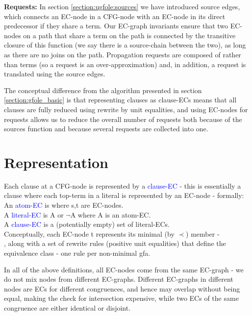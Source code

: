 \textbf{Requests:} In section \ref{section:ugfole:sources} we have introduced source edges, which connects an EC-node in a CFG-node with an EC-node in its direct predecessor if they share a term. Our EC-graph invariants ensure that two EC-nodes on a path that share a term on the path is connected by the transitive closure of this function (we say there is a source-chain between the two), as long as there are no joins on the path. Propagation requests are composed of \GFAs{} rather than terms (so a request is an over-approximation) and, in addition, a request is translated using the source edges.

\bigskip

The conceptual difference from the algorithm presented in section \ref{section:gfole_basic} is that representing clauses as clause-ECs means that all clauses are fully reduced using rewrite by unit equalities, and using EC-nodes for requests allows us to reduce the overall number of requests both because of the sources function and because several requests are collected into one.

\section*{Representation}
Each clause at a CFG-node is represented by a \textcolor{blue}{clause-EC} - this is essentially a clause where each top-term in a literal is represented by an EC-node - formally:\\
An \textcolor{blue}{atom-EC} is  where s,t are EC-nodes.\\
A \textcolor{blue}{literal-EC} is A or $\lnot$A where A is an atom-EC.\\
A \textcolor{blue}{clause-EC} is a (potentially empty) set of literal-ECs.\\
Conceptually, each EC-node t represents its minimal (by $\prec$) member	- \\
, 
along with a set of rewrite rules (positive unit equalities) that define the equivalence class - one rule per non-minimal gfa.

In all of the above definitions, all EC-nodes come from the same EC-graph - we do not mix nodes from different EC-graphs.
Different EC-graphs in different nodes are ECs for different congruences, and hence may overlap without being equal, making the check for intersection expensive, while two ECs of the same congruence are either identical or disjoint.

